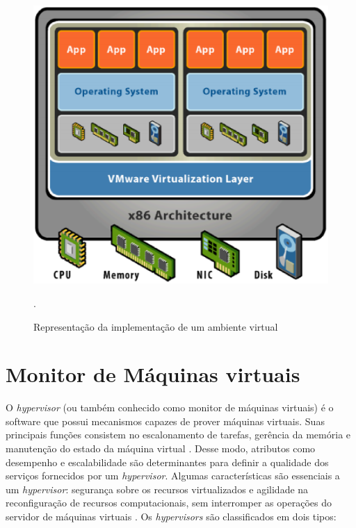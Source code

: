 \begin{figure}[!htb]
\centering
\includegraphics [keepaspectratio=true,scale=0.40]{figuras/virtualization_arc_2.eps}
\caption{Representação da implementação de um ambiente virtual}
\cite{vmware}.
\label{arc_virtualization}
\end{figure} 
 
\section{Monitor de Máquinas virtuais}
O \textit{hypervisor} (ou também conhecido como monitor de máquinas virtuais) é o software que possui mecanismos capazes de prover máquinas virtuais. Suas principais funções consistem no escalonamento de tarefas, gerência da memória e manutenção do estado da máquina virtual \cite{manoel}. Desse modo, atributos como desempenho e escalabilidade são determinantes para definir a qualidade dos serviços fornecidos por um \textit{hypervisor}. Algumas características são essenciais a um \textit{hypervisor}: segurança sobre os recursos virtualizados e agilidade na reconfiguração de recursos computacionais, sem interromper as operações do servidor de máquinas virtuais \cite{manoel}. Os \textit{hypervisors} são classificados em dois tipos:

